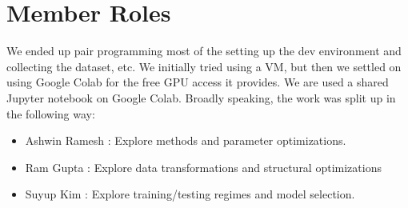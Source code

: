 \section{Member Roles}
We ended up pair programming most of the setting up the dev environment and collecting the dataset, etc. We initially tried using a VM, but then we settled on using Google Colab for the free GPU access it provides. We are used a shared Jupyter notebook on Google Colab. Broadly speaking, the work was split up in the following way: 
\begin{itemize}
    \item Ashwin Ramesh : Explore methods and parameter optimizations. 
    \item Ram Gupta : Explore data transformations and structural optimizations
    \item Suyup Kim : Explore training/testing regimes and model selection. 
\end{itemize}